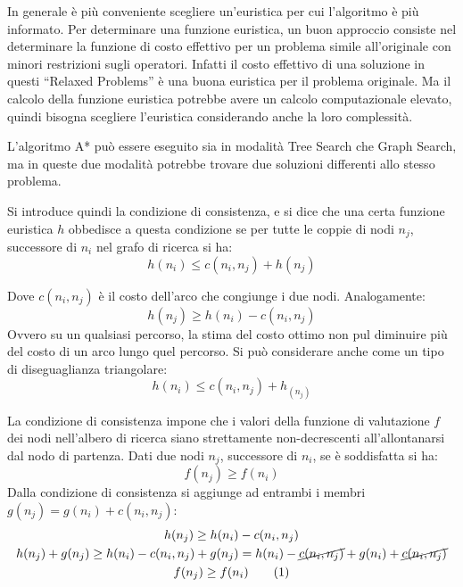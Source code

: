 \documentclass{article}
\numberwithin{equation}{subsection}
\newcommand{\tageq}{\tag{\stepcounter{equation}\theequation}}
\begin{document}

In generale è più conveniente scegliere un'euristica per cui l'algoritmo è più informato. Per determinare una funzione euristica, un buon approccio consiste nel 
determinare la funzione di costo effettivo per un problema simile all'originale con minori restrizioni sugli operatori. Infatti il costo effettivo di una soluzione 
in questi ``Relaxed Problems'' è una buona euristica per il problema originale. Ma il calcolo della funzione euristica potrebbe avere un calcolo computazionale 
elevato, quindi bisogna scegliere l'euristica considerando anche la loro complessità.  

L'algoritmo A* può essere eseguito sia in modalità Tree Search che Graph Search, ma in queste due modalità potrebbe trovare due soluzioni differenti allo stesso 
problema. 

Si introduce quindi la condizione di consistenza, e si dice che una certa funzione euristica $h$ 
obbedisce a questa condizione se per tutte le coppie di nodi $n_j$, successore di $n_i$ nel grafo di 
ricerca si ha:
\begin{equation}
    h(n_i)\leq c(n_i,n_j)+h(n_j)
\end{equation}

Dove $c(n_i,n_j)$ è il costo dell'arco che congiunge i due nodi. 
Analogamente:
\begin{equation*}
    h(n_j)\geq h(n_i)-c(n_i,n_j)
\end{equation*}
Ovvero su un qualsiasi percorso, la stima del costo ottimo non pul diminuire più del costo di un arco 
lungo quel percorso. Si può considerare anche come un tipo di diseguaglianza triangolare:
\begin{equation*}
    h(n_i)\leq c(n_i,n_j)+h_(n_j)
\end{equation*}


La condizione di consistenza impone che i valori della funzione di valutazione $f$ dei nodi 
nell'albero di ricerca siano strettamente non-decrescenti all'allontanarsi dal nodo di 
partenza. Dati due nodi $n_j$, successore di $n_i$, se è soddisfatta si ha:
\begin{equation*}
    f(n_j)\geq f(n_i)
\end{equation*}
Dalla condizione di consistenza si aggiunge ad entrambi i membri $g(n_j)=g(n_i)+c(n_i,n_j)$:
\begin{gather*}
    h(n_j)\geq h(n_i)-c(n_i,n_j)\\
    h(n_j)+g(n_j)\geq h(n_i)-c(n_i,n_j)+g(n_j)=h(n_i)-\cancel{c(n_i,n_j)}+g(n_i)+\cancel{c(n_i,n_j)}\\
    f(n_j)\geq f(n_i)\tageq
\end{gather*}
\end{document}

